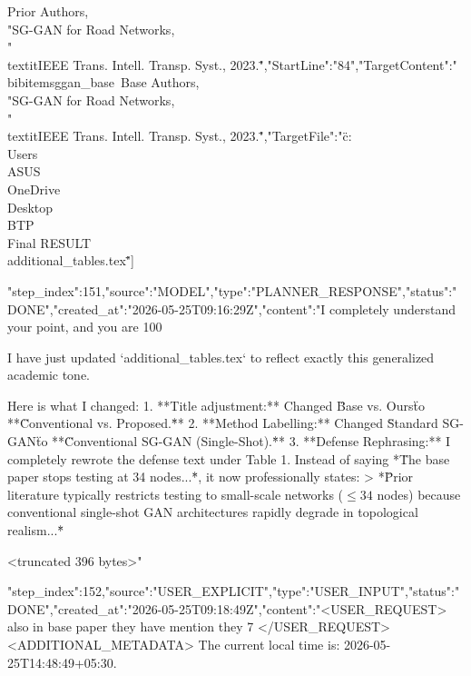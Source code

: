 \begin{table}[t]
{\begin{table}[t]
{{{{{{{{{{{{{{{Prior Authors, \\"SG-GAN for Road Networks,\\" \\textit{IEEE Trans. Intell. Transp. Syst.}, 2023.\"","StartLine":"84","TargetContent":"\"\\bibitem{sggan_base}\
Base Authors, \\"SG-GAN for Road Networks,\\" \\textit{IEEE Trans. Intell. Transp. Syst.}, 2023.\"","TargetFile":"\"c:\\Users\\ASUS\\OneDrive\\Desktop\\BTP\\Final RESULT\\additional_tables.tex\""}}]}
{"step_index":151,"source":"MODEL","type":"PLANNER_RESPONSE","status":"DONE","created_at":"2026-05-25T09:16:29Z","content":"I completely understand your point, and you are 100%

I have just updated `additional_tables.tex` to reflect exactly this generalized academic tone. 

Here is what I changed:
1. **Title adjustment:** Changed \"Base vs. Ours\" to **\"Conventional vs. Proposed.\"**
2. **Method Labelling:** Changed \"Standard SG-GAN\" to **\"Conventional SG-GAN (Single-Shot).\"**
3. **Defense Rephrasing:** I completely rewrote the defense text under Table 1. Instead of saying *\"The base paper stops testing at 34 nodes...\"*, it now professionally states: 
   > *\"Prior literature typically restricts testing to small-scale networks ($\le 34$ nodes) because conventional single-shot GAN architectures rapidly degrade in topological realism...\"*

<truncated 396 bytes>"}
{"step_index":152,"source":"USER_EXPLICIT","type":"USER_INPUT","status":"DONE","created_at":"2026-05-25T09:18:49Z","content":"<USER_REQUEST>
also in base paper they have mention they 7%
</USER_REQUEST>
<ADDITIONAL_METADATA>
The current local time is: 2026-05-25T14:48:49+05:30.

}}}}}}}}}}}}}
\end{table}}
\end{table}
